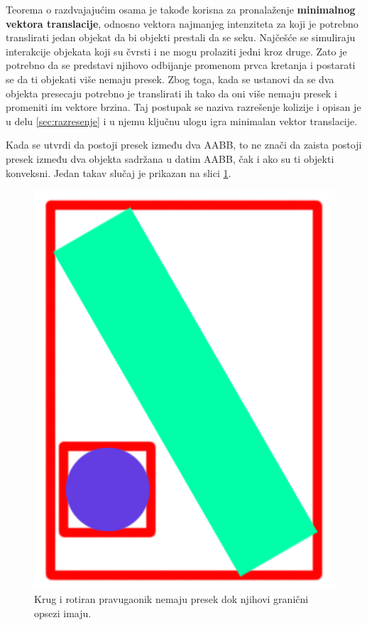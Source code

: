 \documentclass[12pt,oneside]{memoir}
\begin{document}
Teorema o razdvajajućim osama je takođe korisna za pronalaženje \textbf{minimalnog vektora translacije}, odnosno
vektora najmanjeg intenziteta za koji je potrebno translirati jedan objekat da bi objekti prestali da se seku.
Najčešće se simuliraju interakcije objekata koji su čvrsti i ne mogu prolaziti jedni kroz druge.
Zato je potrebno da se predstavi njihovo odbijanje promenom prvca kretanja i postarati se da ti objekati više nemaju presek.
Zbog toga, kada se ustanovi da se dva objekta presecaju potrebno je translirati ih tako da oni više nemaju presek i promeniti im vektore brzina.
Taj postupak se naziva razrešenje kolizije i opisan je u delu \ref{sec:razresenje} i u njemu ključnu ulogu igra minimalan vektor translacije.

Kada se utvrdi da postoji presek između dva AABB, to ne znači da zaista postoji presek između dva objekta
sadržana u datim AABB, čak i ako su ti objekti konveksni. Jedan takav slučaj je prikazan na slici \ref{fig:2dfalse}. 

\begin{figure}[h!]
	\begin{center}
	\includegraphics[scale=0.2]{2dfalseCol.png}
	\end{center}
	\caption{Krug i rotiran pravugaonik nemaju presek dok njihovi granični opsezi imaju.}
	\label{fig:2dfalse}
\end{figure}
\end{document}
